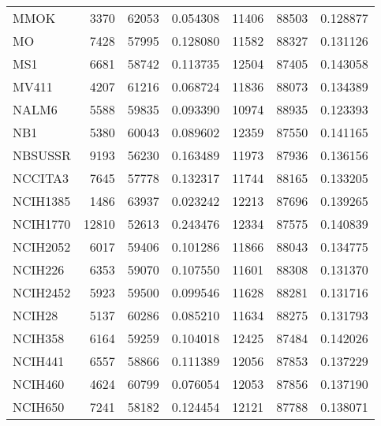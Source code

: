 \begin{tabular}{lrrrrrr}
                                 MMOK &      3370 &    62053 &  0.054308 &     11406 &    88503 &  0.128877 \\
                                   MO &      7428 &    57995 &  0.128080 &     11582 &    88327 &  0.131126 \\
                                  MS1 &      6681 &    58742 &  0.113735 &     12504 &    87405 &  0.143058 \\
                                MV411 &      4207 &    61216 &  0.068724 &     11836 &    88073 &  0.134389 \\
                                NALM6 &      5588 &    59835 &  0.093390 &     10974 &    88935 &  0.123393 \\
                                  NB1 &      5380 &    60043 &  0.089602 &     12359 &    87550 &  0.141165 \\
                              NBSUSSR &      9193 &    56230 &  0.163489 &     11973 &    87936 &  0.136156 \\
                              NCCITA3 &      7645 &    57778 &  0.132317 &     11744 &    88165 &  0.133205 \\
                             NCIH1385 &      1486 &    63937 &  0.023242 &     12213 &    87696 &  0.139265 \\
                             NCIH1770 &     12810 &    52613 &  0.243476 &     12334 &    87575 &  0.140839 \\
                             NCIH2052 &      6017 &    59406 &  0.101286 &     11866 &    88043 &  0.134775 \\
                              NCIH226 &      6353 &    59070 &  0.107550 &     11601 &    88308 &  0.131370 \\
                             NCIH2452 &      5923 &    59500 &  0.099546 &     11628 &    88281 &  0.131716 \\
                               NCIH28 &      5137 &    60286 &  0.085210 &     11634 &    88275 &  0.131793 \\
                              NCIH358 &      6164 &    59259 &  0.104018 &     12425 &    87484 &  0.142026 \\
                              NCIH441 &      6557 &    58866 &  0.111389 &     12056 &    87853 &  0.137229 \\
                              NCIH460 &      4624 &    60799 &  0.076054 &     12053 &    87856 &  0.137190 \\
                              NCIH650 &      7241 &    58182 &  0.124454 &     12121 &    87788 &  0.138071 \\

\end{tabular}
